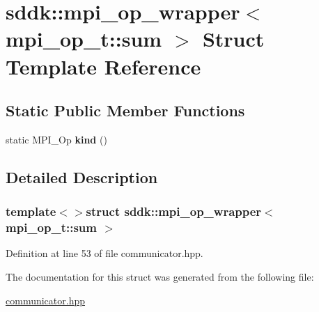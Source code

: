 \hypertarget{structsddk_1_1mpi__op__wrapper_3_01mpi__op__t_1_1sum_01_4}{}\section{sddk\+:\+:mpi\+\_\+op\+\_\+wrapper$<$ mpi\+\_\+op\+\_\+t\+:\+:sum $>$ Struct Template Reference}
\label{structsddk_1_1mpi__op__wrapper_3_01mpi__op__t_1_1sum_01_4}
\subsection*{Static Public Member Functions}
\begin{DoxyCompactItemize}
\item 
\hypertarget{structsddk_1_1mpi__op__wrapper_3_01mpi__op__t_1_1sum_01_4_a06bb9d21ef9f22014ae20354ecf6eac3}{}static M\+P\+I\+\_\+\+Op {\bfseries kind} ()\label{structsddk_1_1mpi__op__wrapper_3_01mpi__op__t_1_1sum_01_4_a06bb9d21ef9f22014ae20354ecf6eac3}

\end{DoxyCompactItemize}


\subsection{Detailed Description}
\subsubsection*{template$<$$>$struct sddk\+::mpi\+\_\+op\+\_\+wrapper$<$ mpi\+\_\+op\+\_\+t\+::sum $>$}



Definition at line 53 of file communicator.\+hpp.



The documentation for this struct was generated from the following file\+:\begin{DoxyCompactItemize}
\item 
\hyperlink{communicator_8hpp}{communicator.\+hpp}\end{DoxyCompactItemize}
